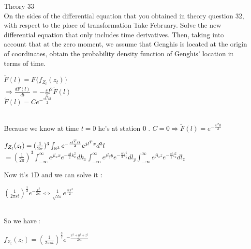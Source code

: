 \documentclass[30pt]{article}
\begin{document}
{\Large \color{blue} Theory 33 } \\
{\color{blue} On the sides of the differential equation that you obtained in theory question 32, with respect to the place of transformation
Take February. Solve the new differential equation that only includes time derivatives. Then, taking into account that at the zero moment, we assume that Genghis is located at the origin of coordinates, obtain the probability density function of Genghis' location in terms of time.
} \\ \newline 
\begin{center}
    $\tilde{F}(l) = F\{ f_{Z_t}(z_t) \} $ \vspace{0.3cm} \\
    $\Rightarrow \frac{d\tilde{F}(l)}{dt} = -\frac{s}{2}l^2 \tilde{F}(l) $ \vspace{0.3cm} \\
    $\tilde{F}(l) = C e^{-\frac{sk^Tkt}{2}} $
\end{center} \\
Because we know at time $t=0$ he's at station 0 . $C =0 \Rightarrow \tilde{F}(l) = e^{-\frac{sl^Tlt}{2}}$ \\
\begin{center}
    $f_{Z_t}(z_t) = (\frac{1}{2\pi})^3 \int_{\Bbb{R}^3} e^{-\frac{sl^Tlt}{2}} e^{jl^Tx}d^3l  $ \vspace{0.3cm} \\
    $=(\frac{1}{2\pi})^3 \int_{-\infty}^{\infty} e^{jl_x x}e^{-\frac{st}{2}k_x^2}dk_x \int_{-\infty}^{\infty} e^{jl_y y}e^{-\frac{st}{2}l_y^2}dl_y \int_{-\infty}^{\infty} e^{jl_z z}e^{-\frac{st}{2}l_z^2}dl_z $
\end{center} 
Now it's 1D and we can solve it : \\ 
\begin{center}
    $(\frac{1}{2\pi st})^{\frac{1}{2}} e^{-\frac{x^2}{2st}} \Longleftrightarrow \frac{1}{\sqrt{2\pi}}e^{\frac{stx^2}{2}} $
\end{center} \\
So we have : 
\begin{center}
    $f_{Z_t}(z_t) = (\frac{1}{2\pi st})^{\frac{3}{2}} e^{-\frac{x^2+y^2+z^2}{2st}} $
\end{center}
\end{document}
